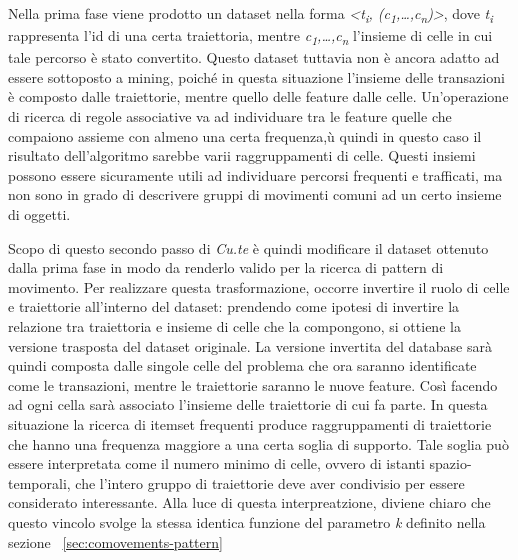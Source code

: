 Nella prima fase viene prodotto un dataset nella forma \textit{<t\textsubscript{i}, (c\textsubscript{1},\ldots,c\textsubscript{n})>},
dove \textit{t\textsubscript{i}} rappresenta l'id di una certa traiettoria, mentre \textit{c\textsubscript{1},\ldots,c\textsubscript{n}}
l'insieme di celle in cui tale percorso è stato convertito.
Questo dataset tuttavia non è ancora adatto ad essere sottoposto a mining, poiché in questa situazione l'insieme delle transazioni è composto dalle traiettorie,
mentre quello delle feature dalle celle.
Un'operazione di ricerca di regole associative va ad individuare tra le feature quelle che compaiono assieme con almeno una certa frequenza,ù
quindi in questo caso il risultato dell'algoritmo sarebbe varii raggruppamenti di celle.
Questi insiemi possono essere sicuramente utili ad individuare percorsi frequenti e trafficati, ma non sono in grado di descrivere gruppi di movimenti comuni ad un certo insieme di oggetti.

Scopo di questo secondo passo di \textit{Cu.te} è quindi modificare il dataset ottenuto dalla prima fase
in modo da renderlo valido per la ricerca di pattern di movimento.
Per realizzare questa trasformazione, occorre invertire il ruolo di celle e traiettorie all'interno del dataset: prendendo come
ipotesi di invertire la relazione tra traiettoria e insieme di celle che la compongono, si ottiene la versione trasposta del dataset originale.
La versione invertita del database sarà quindi composta dalle singole celle del problema che ora saranno identificate
come le transazioni, mentre le traiettorie saranno le nuove feature. Così facendo ad ogni cella sarà associato l'insieme delle traiettorie di cui
fa parte.
In questa situazione la ricerca di itemset frequenti produce raggruppamenti di traiettorie che hanno una frequenza maggiore
a una certa soglia di supporto.
Tale soglia può essere interpretata come il numero minimo di celle, ovvero di istanti spazio-temporali, che
l'intero gruppo di traiettorie deve aver condivisio per essere considerato interessante.
Alla luce di questa interpreatzione, diviene chiaro che questo vincolo svolge la stessa identica funzione del parametro \textit{k} definito nella sezione
~\cref{sec:comovements-pattern}

